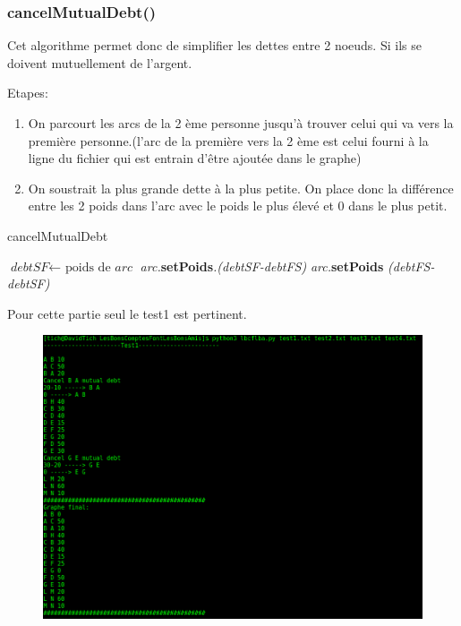 \documentclass[a4paper]{article}
\begin{document}
\subsubsection{cancelMutualDebt()}
Cet algorithme permet donc de simplifier les dettes entre 2 noeuds. Si ils se doivent mutuellement de l'argent.

Etapes:
\begin{enumerate}
\item On parcourt les arcs de la 2 ème personne jusqu'à trouver celui qui va vers la première personne.(l'arc de la première vers la 2 ème est celui fourni à la ligne du fichier qui est entrain d'être ajoutée dans le graphe)
\item On soustrait la plus grande dette à la plus petite. On place donc la différence entre les 2 poids dans l'arc avec le poids le plus élevé et 0 dans le plus petit.
\end{enumerate}
\begin{algorithm}[H]
\caption{cancelMutualDebt}\label{cancelMutualDebt}
\begin{algorithmic}[1]
\State $\textit{debtSF} \gets \text{ poids de } \textit{arc}$
\State \textit{arc.}\textbf{setPoids}\textit{.(debtSF-debtFS)}
\State {}
\Else
\State \textit{arc.}\textbf{setPoids}
\State {} \textit{(debtFS-debtSF)}
\EndIf
\EndIf
\EndFor
{}
\EndProcedure
\end{algorithmic}
\end{algorithm}
Pour cette partie seul le test1 est pertinent.
\begin{figure}[H]
\includegraphics[scale=0.4]{cancel.png}\\
\end{figure}
\end{document}
